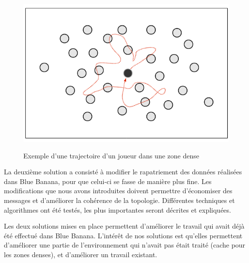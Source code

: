 	\vspace{5mm}
        \begin{figure}[!h]
        \centering
        \includegraphics[scale=0.45]{./Ressources/Images/mouvementsZoneDense.png}\\
        \caption{Exemple d'une trajectoire d'un joueur dans une zone dense}
        \label{mouveDense}
        \end{figure}
\par La deuxième solution a consisté à modifier le rapatriement des données réalisées dans Blue Banana, pour que celui-ci se fasse de manière plus fine. Les modifications que nous avons introduites doivent permettre d'économiser des messages et d'améliorer la cohérence de la topologie. Différentes techniques et algorithmes ont été testés, les plus importantes seront décrites et expliquées.
\par Les deux solutions mises en place permettent d'améliorer le travail qui avait déjà été effectué dans Blue Banana. L'intérêt de nos solutions est qu'elles permettent d'améliorer une partie de l'environnement qui n'avait pas était traité (cache pour les zones denses), et d'améliorer un travail existant.


